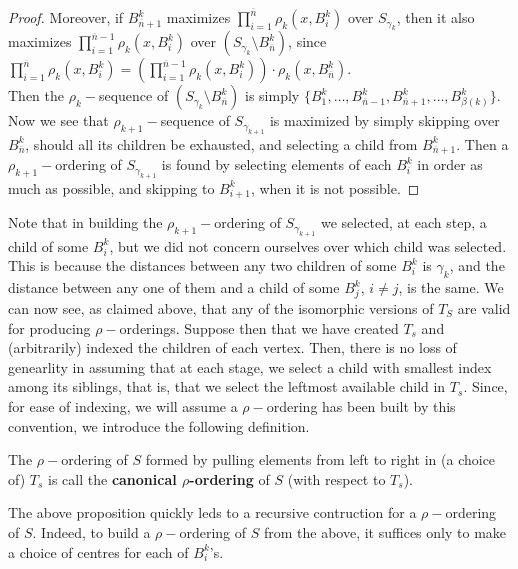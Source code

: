 \begin{proof}
Moreover, if $B^k_{\overline{n}+1}$ maximizes $\prod^{\overline{n}}_{i=1} \rho_{k}(x, B^k_i)$ over $S_{\gamma_k}$, then it also maximizes $\prod^{\overline{n}-1}_{i=1} \rho_{k}(x, B^k_i)$ over $(S_{\gamma_k} \setminus B^k_{\overline{n}})$, since $\prod^{\overline{n}}_{i=1} \rho_{k}(x, B^k_i) = (\prod^{\overline{n}-1}_{i=1} \rho_{k}(x, B^k_i)) \cdot \rho_{k}(x, B^k_{\overline{n}})$.\\

Then the $\rho_k-$sequence of  $(S_{\gamma_k}\setminus B^k_{\overline{n}})$ is simply $\{B^k_1,\ldots, B^k_{\overline{n}-1}, B^k_{\overline{n}+1},\ldots, B^k_{\beta(k)}\}$.\\

Now we see that $\rho_{k+1}-$sequence of $S_{\gamma_{k+1}}$ is maximized by simply skipping over $B^k_{\overline{n}}$, should all its children be exhausted, and selecting a child from $B^k_{\overline{n}+1}$. Then a $\rho_{k+1}-$ordering of $S_{\gamma_{k+1}}$ is found by selecting elements of each $B^k_i$ in order as much as possible, and skipping to $B^k_{i+1}$, when it is not possible.

\end{proof}
Note that in building the $\rho_{k+1}-$ordering of $S_{\gamma_{k+1}}$ we selected, at each step, a child of some $B^k_i$, but we did not concern ourselves over which child was selected. This is because the distances between any two children of some $B^k_i$  is $\gamma_k$, and the distance between any one of them and a child of some $B^k_j$, $i \neq j$, is the same. We can now see, as claimed above, that any of the isomorphic versions of $T_ S$ are valid for producing $\rho-$orderings. Suppose then that we have created $T_s$ and (arbitrarily) indexed the children of each vertex. Then, there is no loss of genearlity in assuming that at each stage, we select a child with smallest index among its siblings, that is, that we select the leftmost available child in $T_s$. Since, for ease of indexing, we will assume a $\rho-$ordering has been built by this convention, we introduce the following definition.\\

\begin{definition}
The $\rho-$ordering of $S$ formed by pulling elements from left to right in (a choice of) $T_s$ is call the \textbf{canonical $\rho$-ordering} of $S$ (with respect to $T_s$).
\end{definition}

The above proposition quickly leds to a recursive contruction for a $\rho-$ordering of $S$. Indeed, to build a $\rho-$ordering of $S$ from the above, it suffices only to make a choice of centres for each of $B^k_i$'s.\\

